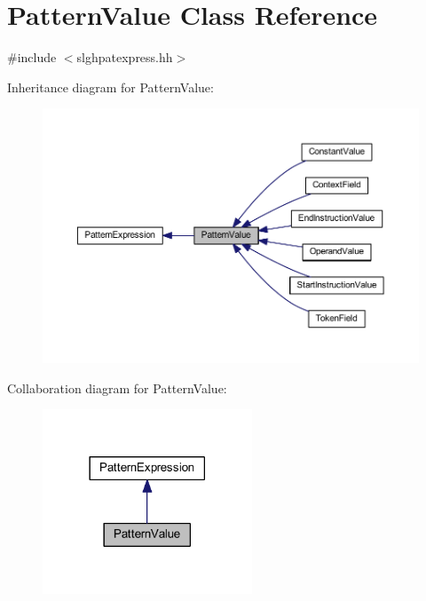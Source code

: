 \hypertarget{class_pattern_value}{}\section{Pattern\+Value Class Reference}
\label{class_pattern_value}


{\ttfamily \#include $<$slghpatexpress.\+hh$>$}



Inheritance diagram for Pattern\+Value\+:
\nopagebreak
\begin{figure}[H]
\begin{center}
\leavevmode
\includegraphics[width=350pt]{class_pattern_value__inherit__graph}
\end{center}
\end{figure}


Collaboration diagram for Pattern\+Value\+:
\nopagebreak
\begin{figure}[H]
\begin{center}
\leavevmode
\includegraphics[width=177pt]{class_pattern_value__coll__graph}
\end{center}
\end{figure}
